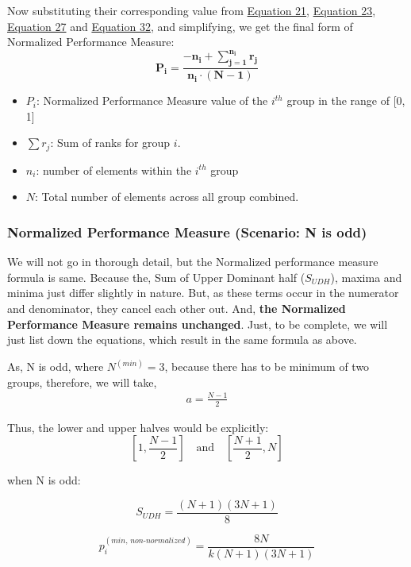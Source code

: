 \documentclass[a4paper,fleqn,review]{cas-sc}
\begin{document}
Now substituting their corresponding value from \hyperref[p-non-normalized]{Equation 21},  
 \hyperref[eq:even-SUDH]{Equation 23}, \hyperref[eq:minima]{Equation 27} and \hyperref[eq:maxima]{Equation 32}, and simplifying, we get the final form of Normalized Performance Measure:
\begin{equation}
	\boxed{
		\mathbf{
			P_i = \frac{-n_i +  \sum\limits_{j=1}^{n_i} r_j}{n_i \cdot (N - 1)}}
	}
\end{equation}
\begin{itemize}
	\item \textbf{$P_i$}: Normalized Performance Measure value of the $i^{th}$ group in the range of [0, 1]
	\item \textbf{$\sum r_j$}: Sum of ranks for group $i$.
	\item \textbf{$n_i$}: number of elements within the $i^{th}$ group
	\item \textbf{$N$}: Total number of elements across all group combined. \hfill \break
\end{itemize}

\subsubsection{Normalized Performance Measure (Scenario: N is odd)}
We will not go in thorough detail, but the Normalized performance measure formula is same. Because the, Sum of Upper Dominant half ($S_{UDH}$), maxima and minima just differ slightly in nature. But, as these terms occur in the numerator and denominator, they cancel each other out. And, \textbf{the Normalized Performance Measure remains unchanged}. Just, to be complete, we will just list down the equations, which result in the same formula as above.

As, N is odd, where $N^{(min)} = 3$, because there has to be minimum of two groups, therefore, we will take,
\begin{align*}
	a = \frac{N-1}{2}
\end{align*}

Thus, the lower and upper halves would be explicitly:
\[
\left[1, \frac{N-1}{2}\right] \quad \text{and} \quad \left[\frac{N+1}{2}, N\right]
\]

when N is odd:

\begin{equation}
	\label{eq:even-SUDH-odd}
	S_{UDH} = \frac{(N+1)(3N+1)}{8}
\end{equation}

\begin{equation}
	\label{eq:minima-odd}
	p_i^{(min, \, non\text{-}normalized)} = \frac{8N}{k (N+1)(3N+1)}
\end{equation}
\end{document}
